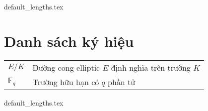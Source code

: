 \documentclass[class=report, crop=false]{standalone}
\begin{document}
	{default_lengths.tex}
	\baselineskip
	\chapter*{Danh sách ký hiệu}
	\begin{tabu}{>{\large\bfseries}m{2cm} >{\large}X[l]}
		$E/K$				&	Đường cong elliptic $E$ định nghĩa trên trường $K$		\\
		$\mathbb{F}_q$		&	Trường hữu hạn có $q$ phần tử							\\

	\end{tabu}
	\newpage
	{default_lengths.tex}
\end{document}
